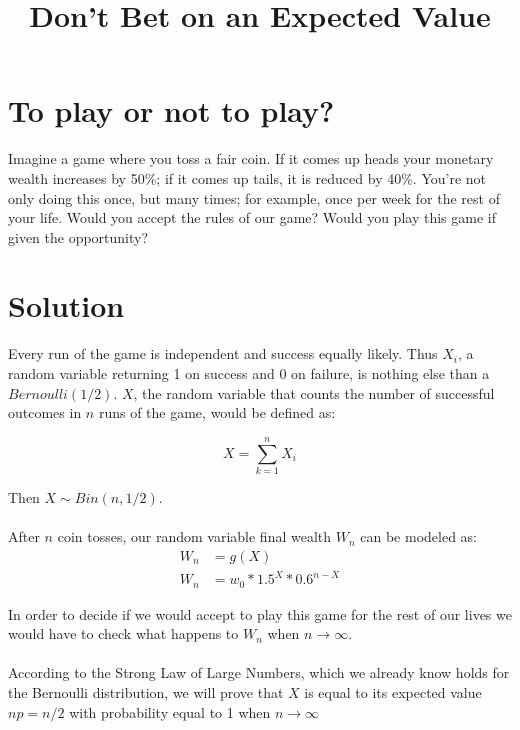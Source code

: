\documentclass[12pt]{article}
\title{Don't Bet on an Expected Value}
\begin{document}
\maketitle
{}

\section{To play or not to play?}

Imagine a game where you toss a fair coin. If it comes up heads your monetary wealth increases by 50\%; if it comes up tails, it is reduced by 40\%. You’re not only doing this once, but many times; for example, once per week for the rest of your life. Would you accept the rules of our game? Would you play this game if given the opportunity?

\section{Solution}
Every run of the game is independent and success equally likely. Thus $X_i$, a random variable returning 1 on success and 0 on failure, is nothing else than a $Bernoulli(1/2)$. $X$, the random variable that counts the number of successful outcomes in $n$ runs of the game, would be defined as:

\begin{equation*}
 X = \sum\limits_{k=1}^{n} X_i
\end{equation*}

Then $X \sim Bin(n, 1/2)$.
\\\\
After $n$ coin tosses, our random variable final wealth $W_n$ can be modeled as:
\begin{equation*}
  \begin{split}
    W_n &= g(X)\\
    W_n &= w_0 * 1.5^X * 0.6^{n-X}
  \end{split}
\end{equation*}

In order to decide if we would accept to play this game for the rest of our lives we would have to check what happens to $W_n$ when $n \rightarrow \infty$.
\\\\
According to the Strong Law of Large Numbers, which we already know holds for the Bernoulli distribution, we will prove that $X$ is equal to its expected value $np = n/2$ with probability equal to 1 when $n \rightarrow \infty$
\end{document}
